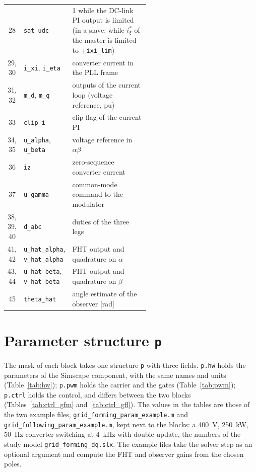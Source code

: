 \documentclass[11pt,a4paper]{scrartcl}
\newcommand{\code}[1]{\texttt{#1}}
\begin{document}
\begin{onehalfspace}
\begin{longtable}{@{} c l p{0.56\linewidth} @{}}
	28 & \code{sat\_udc} & 1 while the DC-link PI output is limited (in a slave: while $i^{*}_\xi$ of the master is limited to $\pm$\code{ixi\_lim}) \\
	29, 30 & \code{i\_xi}, \code{i\_eta} & converter current in the PLL frame \\
	31, 32 & \code{m\_d}, \code{m\_q} & outputs of the current loop (voltage reference, pu) \\
	33 & \code{clip\_i} & clip flag of the current PI \\
	34, 35 & \code{u\_alpha}, \code{u\_beta} & voltage reference in $\alpha\beta$ \\
	36 & \code{iz} & zero-sequence converter current \\
	37 & \code{u\_gamma} & common-mode command to the modulator \\
	38, 39, 40 & \code{d\_abc} & duties of the three legs \\
	41, 42 & \code{u\_hat\_alpha}, \code{v\_hat\_alpha} & FHT output and quadrature on $\alpha$ \\
	43, 44 & \code{u\_hat\_beta}, \code{v\_hat\_beta} & FHT output and quadrature on $\beta$ \\
	45 & \code{theta\_hat} & angle estimate of the observer [\si{\radian}] \\
\end{longtable}
\normalsize
{}

\section{Parameter structure \code{p}}
\label{sec:param}

The mask of each block takes one structure \code{p} with three fields. \code{p.hw} holds the parameters of the Simscape component, with the same names and units (Table~\ref{tab:hw}); \code{p.pwm} holds the carrier and the gates (Table~\ref{tab:pwm}); \code{p.ctrl} holds the control, and differs between the two blocks (Tables~\ref{tab:ctrl_gfm} and~\ref{tab:ctrl_gfl}). The values in the tables are those of the two example files, \code{grid\_forming\_param\_example.m} and \code{grid\_following\_param\_example.m}, kept next to the blocks: a \SI{400}{\volt}, \SI{250}{\kilo\watt}, \SI{50}{\hertz} converter switching at \SI{4}{\kilo\hertz} with double update, the numbers of the study model \code{grid\_forming\_dq.slx}. The example files take the solver step as an optional argument and compute the FHT and observer gains from the chosen poles.


\end{onehalfspace}
\end{document}
